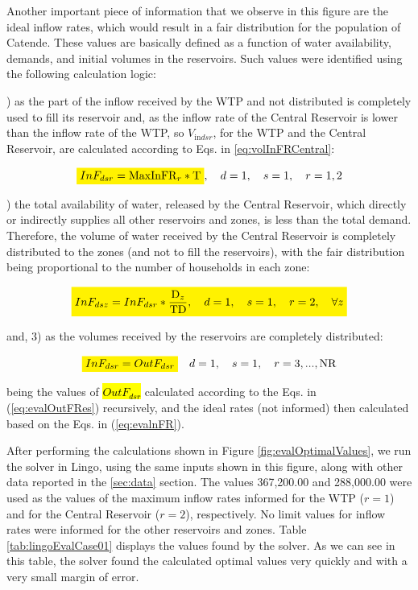 \documentclass{singlecol}
\newcommand{\mathcolorbox}[2]{\colorbox{#1}{$\displaystyle #2$}}
\theoremstyle{TH}{
\newtheorem{lemma}{Lemma}
\newtheorem{theorem}[lemma]{Theorem}
\newtheorem{corrolary}[lemma]{Corrolary}
\newtheorem{conjecture}[lemma]{Conjecture}
\newtheorem{proposition}[lemma]{Proposition}
\newtheorem{claim}[lemma]{Claim}
\newtheorem{stheorem}[lemma]{Wrong Theorem}
\newtheorem{algorithm}{Algorithm}
}
\theoremstyle{THrm}{
\newtheorem{definition}{Definition}[section]
\newtheorem{question}{Question}[section]
\newtheorem{remark}{Remark}
\newtheorem{scheme}{Scheme}
}
\theoremstyle{THhit}{
\newtheorem{case}{Case}[section]
}
\begin{document}
Another important piece of information that we observe in this figure are the ideal inflow rates, which would result in a fair distribution for the population of Catende. These values are basically defined as a function of water availability, demands, and initial volumes in the reservoirs. Such values were identified using the following calculation logic:

) as the part of the inflow received by the WTP and not distributed is completely used to fill its reservoir and, as the inflow rate of the Central Reservoir is lower than the inflow rate of the WTP, so $V_{\mathrm{in}dsr}$, for the WTP and the Central Reservoir, are calculated according to Eqs. in \ref{eq:volInFRCentral}: 

\begin{equation}
	\mathcolorbox{yellow}{InF_{dsr} = \mathrm{MaxInFR}_r * \mathrm{T}}, \quad d = 1, \quad s = 1, \quad r = 1,2
	\label{eq:volInFRCentral}
\end{equation}

) the total availability of water, released by the Central Reservoir, which directly or indirectly supplies all other reservoirs and zones, is less than the total demand. Therefore, the volume of water received by the Central Reservoir is completely distributed to the zones (and not to fill the reservoirs), with the fair distribution being proportional to the number of households in each zone: 

\begin{equation}
	\mathcolorbox{yellow}{InF_{dsz} = InF_{dsr} * \dfrac{\mathrm{D}_z}{ \mathrm{TD}},
	\quad d = 1, \quad s = 1, \quad r = 2, \quad \forall z}  
\end{equation}

\noindent and, 3) as the volumes received by the reservoirs are completely distributed: 

\begin{equation}
	\mathcolorbox{yellow}{InF_{dsr} = OutF_{dsr}} \quad d = 1, \quad s = 1, \quad r=3, ..., \mathrm{NR}
\end{equation}

\noindent being the values of \hl{$OutF_{dsr}$} calculated according to the Eqs. in (\ref{eq:evalOutFRes}) recursively, and the ideal rates (not informed) then calculated based on the Eqs. in (\ref{eq:evalnFR}).

After performing the calculations shown in Figure \ref{fig:evalOptimalValues}, we run the solver in Lingo, using the same inputs shown in this figure, along with other data reported in the \ref{sec:data} section. The values 367,200.00 and 288,000.00 were used as the values of the maximum inflow rates informed for the WTP ($r=1$) and for the Central Reservoir ($r=2$), respectively. No limit values for inflow rates were informed for the other reservoirs and zones. Table \ref{tab:lingoEvalCase01} displays the values found by the solver. As we can see in this table, the solver found the calculated optimal values very quickly and with a very small margin of error. 
\end{document}
